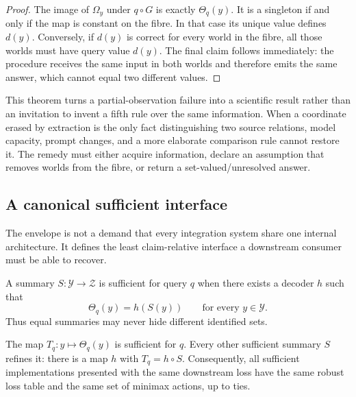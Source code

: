\begin{proof}
The image of $\Omega_y$ under $q\circ G$ is exactly $\Theta_q(y)$. It is a
singleton if and only if the map is constant on the fibre. In that case its
unique value defines $d(y)$. Conversely, if $d(y)$ is correct for every world
in the fibre, all those worlds must have query value $d(y)$. The final claim
follows immediately: the procedure receives the same input in both worlds and
therefore emits the same answer, which cannot equal two different values.
\end{proof}

This theorem turns a partial-observation failure into a scientific result
rather than an invitation to invent a fifth rule over the same information.
When a coordinate erased by extraction is the only fact distinguishing two
source relations, model capacity, prompt changes, and a more elaborate
comparison rule cannot restore it. The remedy must either acquire information,
declare an assumption that removes worlds from the fibre, or return a
set-valued/unresolved answer.

\subsection{A canonical sufficient interface}

The envelope is not a demand that every integration system share one internal
architecture. It defines the least claim-relative interface a downstream
consumer must be able to recover.

\begin{definition}
A summary $S:\mathcal Y\to\mathcal Z$ is sufficient for query $q$ when there
exists a decoder $h$ such that
\begin{equation}
  \Theta_q(y)=h(S(y))\qquad\text{for every }y\in\mathcal Y.
\end{equation}
Thus equal summaries may never hide different identified sets.
\end{definition}

\begin{theorem}
\label{thm:factorisation}
The map $T_q:y\mapsto\Theta_q(y)$ is sufficient for $q$. Every other sufficient
summary $S$ refines it: there is a map $h$ with $T_q=h\circ S$. Consequently,
all sufficient implementations presented with the same downstream loss have
the same robust loss table and the same set of minimax actions, up to ties.
\end{theorem}

